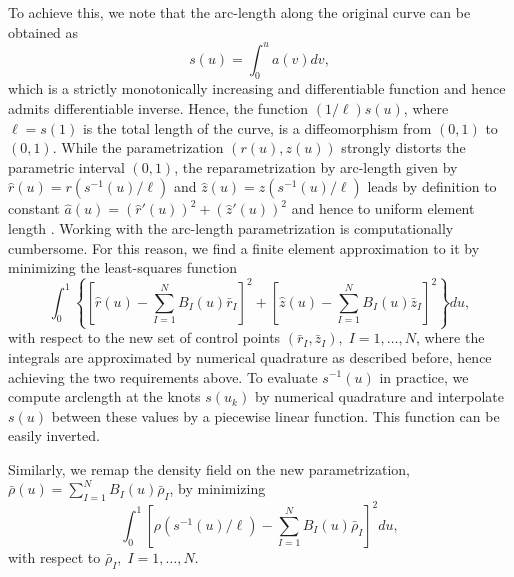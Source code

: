 {To achieve this, we note that the arc-length along the original curve can be obtained as 
\begin{equation}
s(u) = \int_{0}^{u} a(v) dv,
\end{equation}
which is a strictly monotonically increasing and differentiable function and hence admits differentiable inverse. Hence, the function $(1/\ell)s(u)$, where $\ell= s(1)$ is the total length of the curve, is a diffeomorphism from $(0,1)$ to $(0,1)$. While the parametrization $({r}(u), {z}(u))$ strongly distorts the parametric interval $(0,1)$, the reparametrization by arc-length given by $\hat{r}(u) = {r}\left(s^{-1}(u)/\ell\right)$ and $\hat{z}(u) =  {z}\left(s^{-1}(u)/\ell\right)$ leads by definition to constant $\hat{a}(u) = (\hat{r}'(u))^2 + (\hat{z}'(u))^2$ and hence to uniform element length  \cite{Do_Carmo2016-kq}. Working  with the arc-length parametrization is computationally cumbersome. For this reason, we find a finite element approximation to it by minimizing the least-squares function
\begin{equation}
\int_0^1 \left\{\left[\hat{r}(u) - \sum_{I=1}^N B_I(u) \bar{r}_I\right]^2 + \left[\hat{z}(u) - \sum_{I=1}^N B_I(u) \bar{z}_I\right]^2\right\} du,
\end{equation}
with respect to the new set of control points $(\bar{r}_I, \bar{z}_I), \; I = 1, \ldots, N$, where the integrals are approximated by numerical quadrature as described before, hence achieving the two requirements above. To evaluate $s^{-1}(u)$ in practice, we compute arclength at the knots $s(u_k)$ by numerical quadrature and interpolate $s(u)$ between these values by a piecewise linear function. This function can be easily inverted. 

Similarly, we remap the density field on the new parametrization, $\bar{\rho}(u)= \sum_{I=1}^N B_I(u) \bar{\rho}_I$, by minimizing 
\begin{equation}
\int_0^1 \left[{\rho}\left(s^{-1}(u)/\ell\right) - \sum_{I=1}^N B_I(u) \bar{\rho}_I\right]^2 du,
\end{equation}
with respect to $\bar{\rho}_I, \; I = 1, \ldots, N$.

}
